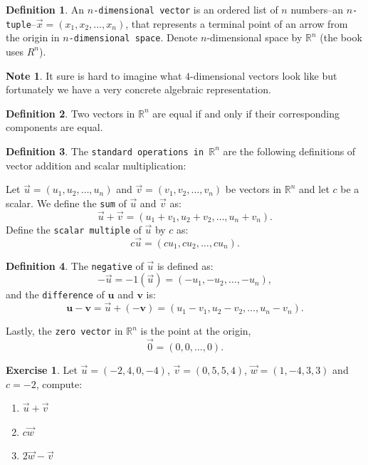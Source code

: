 \documentclass{beamer}
\newcommand{\R}{\mathbb{R}}
\newcommand{\vecu}{\mathbf{u}}
\newcommand{\vecv}{\mathbf{v}}
\newcommand{\fn}{\insertframenumber}
\theoremstyle{definition}
\newtheorem{exercise}{Exercise}
\newtheorem*{defn}{Definition}
\newtheorem*{nb}{Note}
\renewcommand{\emph}[1]{{\color{blue}\texttt{#1}}}
\begin{document}
\begin{frame}{\fn}
	\begin{defn}
		An \emph{$n$-dimensional vector} is an ordered list of $n$ numbers--an \emph{$n$-tuple}--$\vec x=(x_1,x_2,\dots,x_n)$, that represents a terminal point of an arrow from the origin in \emph{$n$-dimensional space}.  Denote $n$-dimensional space by $\R^n$ (the book uses $R^n$).
	\end{defn}
	\begin{nb}
		It sure is hard to imagine what $4$-dimensional vectors look like but fortunately we have a very concrete algebraic representation.
	\end{nb}
	\begin{defn}
		Two vectors in $\R^n$ are equal if and only if their corresponding components are equal.
	\end{defn}
\end{frame}
\begin{frame}{\fn}
	\begin{defn}
		The \emph{standard operations in $\R^n$} are the following definitions of vector addition and scalar multiplication:
		
		Let $\vec u= (u_1,u_2,\dots,u_n)$ and $\vec v=(v_1,v_2,\dots,v_n)$ be vectors in $\R^n$ and let $c$ be a scalar. We define the \emph{sum} of $\vec u$ and $\vec v$ as:
			\[\vec u+\vec v=(u_1+v_1,u_2+v_2,\dots,u_n+v_n).\]
		Define the \emph{scalar multiple} of $\vec u$ by $c$ as:
			\[c\vec u=(cu_1,cu_2,\dots,cu_n).\]
\end{defn}
\end{frame}
\begin{frame}{\fn}
	\begin{defn} 		
		The \emph{negative} of $\vec u$ is defined as:
		\[-\vec u = -1(\vec u)=(-u_1,-u_2,\dots,-u_n),\]
		and the \emph{difference} of $\vecu$ and $\vecv$ is:
		\[\vecu-\vecv=\vec u+(-\vecv)=(u_1-v_1,u_2-v_2,\dots,u_n-v_n).\]
		
		Lastly, the \emph{zero vector} in $\R^n$ is the point at the origin, \[\vec 0=(0,0,\dots,0).\]
	\end{defn}
\end{frame}
\begin{frame}{\fn}
	\begin{exercise}
		Let $\vec u = (-2, 4, 0, -4)$, $\vec v= (0, 5, 5, 4)$, $\vec w = (1, -4, 3, 3)$ and $c=-2$, compute:
	\begin{enumerate}[label=(\alph*)]
		\item $\vec u+\vec v$
		\item $c\vec w$
		\item $2\vec w-\vec v$
	\end{enumerate}
	\end{exercise}
\end{frame}
\end{document}
